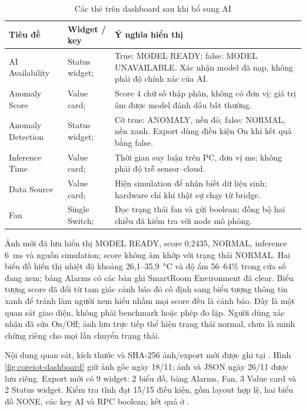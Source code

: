 \begin{longtable}{P{3.3cm}P{3.6cm}P{7cm}}
\caption{Các thẻ trên dashboard sau khi bổ sung AI}\label{tab:coreiot-ai-cards}\\
\toprule Tiêu đề & Widget / key & Ý nghĩa hiển thị \\ \midrule
AI Availability & Status widget;  & True: MODEL READY; false: MODEL UNAVAILABLE. Xác nhận model đã nạp, không phải độ chính xác của AI. \\
Anomaly Score & Value card;  & Score 4 chữ số thập phân, không có đơn vị; giá trị âm được model đánh dấu bất thường. \\
Anomaly Detection & Status widget;  & Cờ true: ANOMALY, nền đỏ; false: NORMAL, nền xanh. Export dùng điều kiện On khi kết quả bằng false. \\
Inference Time & Value card;  & Thời gian suy luận trên PC, đơn vị ms; không phải độ trễ sensor--cloud. \\
Data Source & Value card;  & Hiện simulation để nhận biết dữ liệu sinh; hardware chỉ khi thật sự chạy từ bridge. \\
Fan & Single Switch;  & Đọc trạng thái fan và gửi  boolean; đồng bộ hai chiều đã kiểm tra với node mô phỏng. \\
\bottomrule
\end{longtable}

Ảnh mới đã lưu hiển thị MODEL READY, score 0,2435, NORMAL, inference 6~ms và nguồn simulation; score không âm khớp với trạng thái NORMAL. Hai biểu đồ hiển thị nhiệt độ khoảng 26,1--35,9~°C và độ ẩm 56--64\% trong cửa sổ đang xem; bảng Alarms có các bản ghi SmartRoom Environment đã clear. Biểu tượng score đã đổi từ tam giác cảnh báo đỏ cố định sang biểu tượng thông tin xanh để tránh làm người xem hiểu nhầm mọi score đều là cảnh báo. Đây là một quan sát giao diện, không phải benchmark hoặc phép đo lặp. Người dùng xác nhận đã sửa On/Off; ảnh lưu trực tiếp thể hiện trạng thái normal, chưa là minh chứng riêng cho mọi lần chuyển trạng thái.

Nội dung quan sát, kích thước và SHA-256 ảnh/export mới được ghi tại . Hình \ref{fig:coreiot-dashboard} giữ ảnh gốc ngày 18/11; ảnh và JSON ngày 26/11 được lưu riêng. Export mới có 9 widget: 2 biểu đồ, bảng Alarms, Fan, 3 Value card và 2 Status widget. Kiểm tra tĩnh đạt 15/15 điều kiện, gồm layout hợp lệ, hai biểu đồ NONE, các key AI và RPC boolean; kết quả ở .

